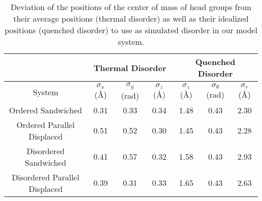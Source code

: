   \begin{table}[h]
  \centering
  \begin{tabular}{c|ccc|ccc}
  \hline
   		                        &           \multicolumn{3}{c}{Thermal Disorder}             &             \multicolumn{3}{c}{Quenched Disorder}               \\
  \hline
  System                        & $\sigma_x$ (\AA) & $\sigma_y$ (rad) & $\sigma_z$ (\AA) & $\sigma_z$ (\AA) & $\sigma_\theta$ (rad) & $\sigma_r$ (\AA) \\
  \hline
  Ordered Sandwiched            &         0.31       &       0.33       &        0.34        &        1.48        &     0.43              &     2.30           \\
  Ordered Parallel Displaced    &         0.51       &       0.52       &        0.30        &        1.45        &     0.43              &     2.28           \\ 
  Disordered Sandwiched         &         0.41       &       0.57       &        0.32        &        1.58        &     0.43              &     2.93           \\
  Disordered Parallel Displaced &         0.39       &       0.31       &        0.33        &        1.65        &     0.43              &     2.63           \\
  \hline
  \end{tabular}
  \caption{Deviation of the positions of the center of mass of head groups from their average
  positions (thermal disorder) as well as their idealized positions (quenched disorder) to use 
  as simulated disorder in our model system.}
  \label{table:quenched_disorder} 
  \end{table}
  

